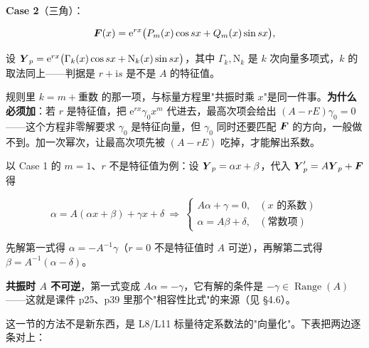 \documentclass[11pt]{ctexart}
\begin{document}
\textbf{Case 2}（三角）：

\[
\boldsymbol{F}(x)=\mathrm{e}^{rx}\bigl(P_m(x)\cos sx+Q_m(x)\sin sx\bigr),
\]

设 $\boldsymbol{Y}_p=\mathrm{e}^{rx}\bigl(\Gamma_k(x)\cos sx+\mathrm{N}_k(x)\sin sx\bigr)$，其中 $\Gamma_k,\mathrm{N}_k$ 是 $k$ 次向量多项式，$k$ 的取法同上——判据是 $r+\mathrm{i}s$ 是不是 $A$ 的特征值。


规则里 $k=m+\text{重数}$ 的那一项，与标量方程里"共振时乘 $x$"是同一件事。\textbf{为什么必须加}：若 $r$ 是特征值，把 $\mathrm{e}^{rx}\gamma_0x^m$ 代进去，最高次项会给出 $(A-rE)\gamma_0=0$——这个方程非零解要求 $\gamma_0$ 是特征向量，但 $\gamma_0$ 同时还要匹配 $\boldsymbol{F}$ 的方向，一般做不到。加一次幂次，让最高次项先被 $(A-rE)$ 吃掉，才能解出系数。


以 Case 1 的 $m=1$、$r$ 不是特征值为例：设 $\boldsymbol{Y}_p=\alpha x+\beta$，代入 $\boldsymbol{Y}_p'=A\boldsymbol{Y}_p+\boldsymbol{F}$ 得

\[
\alpha=A(\alpha x+\beta)+\gamma x+\delta
\ \Longrightarrow\
\begin{cases}
A\alpha+\gamma=0, & (x\text{ 的系数})\\
\alpha=A\beta+\delta, & (\text{常数项})
\end{cases}
\]

先解第一式得 $\alpha=-A^{-1}\gamma$（$r=0$ 不是特征值时 $A$ 可逆），再解第二式得 $\beta=A^{-1}(\alpha-\delta)$。

\textbf{共振时 $A$ 不可逆}，第一式变成 $A\alpha=-\gamma$，它有解的条件是 $-\gamma\in\operatorname{Range}(A)$——这就是课件 p25、p39 里那个"相容性比式"的来源（见 §4.6）。


这一节的方法不是新东西，是 L8/L11 标量待定系数法的"向量化"。下表把两边逐条对上：
\end{document}
